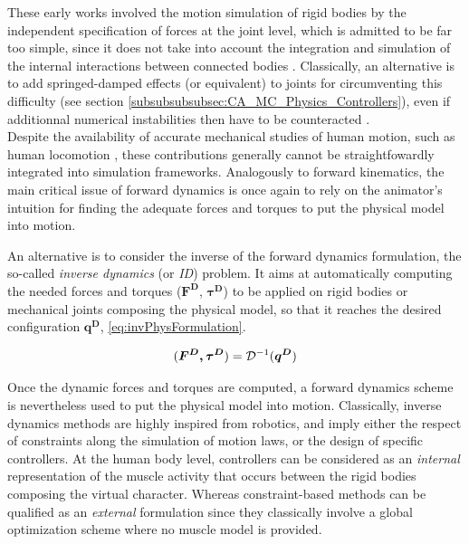 These early works involved the motion simulation of rigid bodies by the independent specification of forces at the joint level, which is admitted to be far too simple, since it does not take into account the integration and simulation of the internal interactions between connected bodies . Classically, an alternative is to add springed-damped effects (or equivalent) to joints for circumventing this difficulty (see section \ref{subsubsubsubsec:CA_MC_Physics_Controllers}), even if additionnal numerical instabilities then have to be counteracted .\\

Despite the availability of accurate mechanical studies of human motion, such as human locomotion , these contributions generally cannot be straightfowardly integrated into simulation frameworks. Analogously to forward kinematics, the main critical issue of forward dynamics is once again to rely on the animator's intuition for finding the adequate forces and torques to put the physical model into motion.


				\label{subsubsubsec:CA_MC_Physics_Inv}
				
An alternative is to consider the inverse of the forward dynamics formulation, the so-called \emph{inverse dynamics} (or \emph{ID}) problem. It aims at automatically computing the needed forces and torques ($\boldsymbol{F^D}$, $\boldsymbol{\tau^D}$) to be applied on rigid bodies or mechanical joints composing the physical model, so that it reaches the desired configuration $\boldsymbol{q^D}$, \myequname \eqref{eq:invPhysFormulation}.

\begin{equation}
	(\boldsymbol{F^D, \tau^D}) = \mathcal{D}^{-1}(\boldsymbol{q^D})
\label{eq:invPhysFormulation}
\eqcaption{Inverse dynamics formulation}
\end{equation}

Once the dynamic forces and torques are computed, a forward dynamics scheme is nevertheless used to put the physical model into motion. Classically, inverse dynamics methods are highly inspired from robotics, and imply either the respect of constraints along the simulation of motion laws, or the design of specific controllers. At the human body level, controllers can be considered as an \emph{internal} representation of the muscle activity that occurs between the rigid bodies composing the virtual character. Whereas constraint-based methods can be qualified as an \emph{external} formulation since they classically involve a global optimization scheme where no muscle model is provided.


